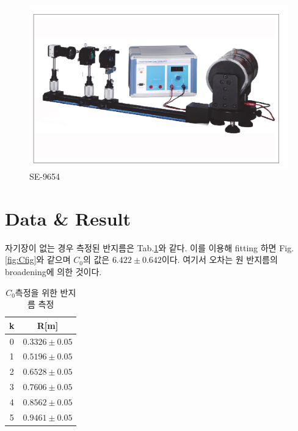 \documentclass[%
 reprint,
 amsmath,amssymb,
 aps,
]{revtex4-2}
\begin{document}
\begin{figure}[htbp]
	\includegraphics[width = 0.95\linewidth]{SE9654.png}%
	\caption{\label{fig:SE9654}SE-9654}
\end{figure}


\section{\label{sec:level1}Data \& Result}
자기장이 없는 경우 측정된 반지름은 Tab.\ref{tab:Cmes}와 같다. 이를 이용해 fitting 하면 Fig.\ref{fig:Cfig}와 같으며 $C_{0}$의 값은 $6.422\pm 0.642 $이다. 여기서 오차는 원 반지름의 broadening에 의한 것이다.

\begin{table}[]
\begin{tabular}{c|c} \hline \hline
k & R[m]  \\ \hline
0 & $0.3326\pm0.05$ \\  
1 & $0.5196\pm0.05$ \\  
2 & $0.6528\pm0.05$ \\  
3 & $0.7606\pm0.05$ \\  
4 & $0.8562\pm0.05$ \\  
5 & $0.9461\pm0.05$ \\  \hline \hline 
\end{tabular}
\caption{\label{tab:Cmes}$C_{0}$측정을 위한 반지름 측정}
\end{table}
\end{document}
